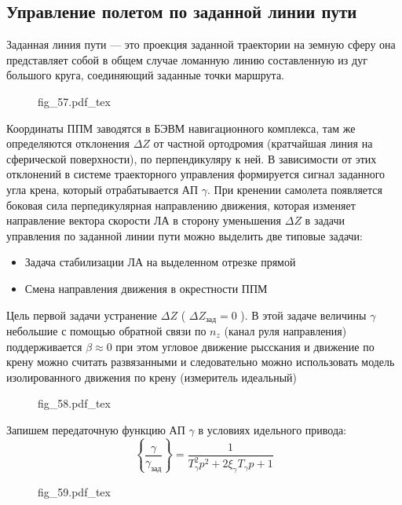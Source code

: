 \documentclass{article}
\newcommand{\incfig}[1]{
    {#1.pdf_tex}
}
\begin{document}
\subsection{Управление полетом по заданной линии пути}
Заданная линия пути --- это проекция заданной траектории на земную сферу она представляет собой в общем случае ломанную линию составленную из дуг большого круга, соединяющий заданные точки маршрута. 

\begin{figure}[ht]
    \centering
    \incfig{fig_57}
    \label{fig:fig_57}
\end{figure}

Координаты ППМ заводятся в БЭВМ навигационного комплекса, там же определяются отклонения $ \Delta Z$ от частной ортодромия (кратчайшая линия на сферической поверхности), по перпендикуляру к ней. В зависимости от этих отклонений в системе траекторного управления формируется сигнал заданного угла крена, который отрабатывается АП $\gamma$. При кренении самолета появляется боковая сила перпедикулярная направлению движения, которая изменяет направление вектора скорости ЛА в сторону уменьшения $\Delta Z$ 
в задачи управления по заданной линии пути можно выделить две типовые задачи:
\begin{itemize}
    \item Задача стабилизации ЛА на выделенном отрезке прямой
    \item Смена направления движения в окрестности ППМ
\end{itemize}
Цель первой задачи устранение $ \Delta Z$ ( $\Delta Z_{зад} = 0$ ). В этой задаче величины $\gamma$ небольшие с помощью обратной связи по $n_z$ (канал руля направления) поддерживается $\beta \approx 0$ при этом угловое движение рысскания и движение по крену можно считать развязанными и следовательно можно использовать модель изолированного движения по крену (измеритель идеальный)

\begin{figure}[H]
    \centering
    \incfig{fig_58}
    \label{fig:fig_58}
\end{figure}

Запишем передаточную функцию АП $\gamma$ в условиях идельного привода:
\[
    \left\{ \frac{\gamma}{\gamma_{зад}} \right\}  = \frac{1}{ T_\gamma^2 p^2 + 2 \xi_\gamma T_\gamma p + 1 }
\]

\begin{figure}[H]
    \centering
    \incfig{fig_59}
    \label{fig:fig_59}
\end{figure}
\end{document}
